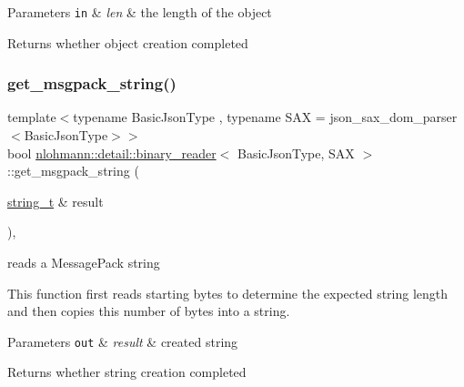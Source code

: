 \begin{DoxyParams}[1]{Parameters}
\mbox{\tt in}  & {\em len} & the length of the object \\
\hline
\end{DoxyParams}
\begin{DoxyReturn}{Returns}
whether object creation completed 
\end{DoxyReturn}
\mbox{\label{classnlohmann_1_1detail_1_1binary__reader_a5526ed98ca4c436cbae6f8a77ea207b8}} 
\subsubsection{\texorpdfstring{get\+\_\+msgpack\+\_\+string()}{get\_msgpack\_string()}}
{\footnotesize\ttfamily template$<$typename Basic\+Json\+Type , typename S\+AX  = json\+\_\+sax\+\_\+dom\+\_\+parser$<$\+Basic\+Json\+Type$>$$>$ \\
bool \hyperlink{classnlohmann_1_1detail_1_1binary__reader}{nlohmann\+::detail\+::binary\+\_\+reader}$<$ Basic\+Json\+Type, S\+AX $>$\+::get\+\_\+msgpack\+\_\+string (\begin{DoxyParamCaption}\item[{\hyperlink{classnlohmann_1_1detail_1_1binary__reader_aa0b9729917ca7ee6ed01e3792341316e}{string\+\_\+t} \&}]{result }\end{DoxyParamCaption})\hspace{0.3cm}{\ttfamily [inline]}, {\ttfamily [private]}}



reads a Message\+Pack string 

This function first reads starting bytes to determine the expected string length and then copies this number of bytes into a string.


\begin{DoxyParams}[1]{Parameters}
\mbox{\tt out}  & {\em result} & created string\\
\hline
\end{DoxyParams}
\begin{DoxyReturn}{Returns}
whether string creation completed 
\end{DoxyReturn}
\mbox{\label{classnlohmann_1_1detail_1_1binary__reader_a161cda5919ea2436b7999c2a76656aba}} 

